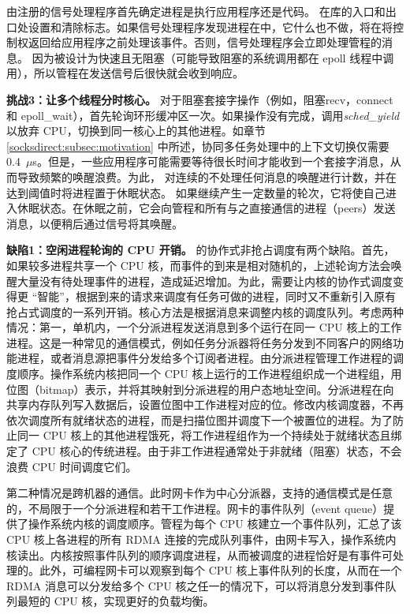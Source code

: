 由\libipc {}注册的信号处理程序首先确定进程是执行应用程序还是\libipc {}代码。 \libipc {}在库的入口和出口处设置和清除标志。如果信号处理程序发现进程在\libipc 中，它什么也不做，\libipc {}将在将控制权返回给应用程序之前处理该事件。否则，信号处理程序会立即处理管程的消息。
因为\libipc {}被设计为快速且无阻塞（可能导致阻塞的系统调用都在 epoll 线程中调用），所以管程在发送信号后很快就会收到响应。

\textbf {挑战3：让多个线程分时核心。}
对于阻塞套接字操作（例如，阻塞recv，connect 和 epoll\_wait），\libipc {}首先轮询环形缓冲区一次。如果操作没有完成，\libipc {}调用\textit {sched\_yield}以放弃 CPU，切换到同一核心上的其他进程。如章节 \ref {socksdirect:subsec:motivation} 中所述，协同多任务处理中的上下文切换仅需要0.4~$\mu$s。但是，一些应用程序可能需要等待很长时间才能收到一个套接字消息，从而导致频繁的唤醒浪费。为此，\libipc{} 对连续的不处理任何消息的唤醒进行计数，并在达到阈值时将进程置于休眠状态。
如果\libipc {}继续产生一定数量的轮次，它将使自己进入休眠状态。在休眠之前，它会向管程和所有与之直接通信的进程（peers）发送消息，以便稍后通过信号将其唤醒。

\textbf{缺陷1：空闲进程轮询的 CPU 开销。}
\libipc{} 的协作式非抢占调度有两个缺陷。首先，如果较多进程共享一个 CPU 核，而事件的到来是相对随机的，上述轮询方法会唤醒大量没有待处理事件的进程，造成延迟增加。为此，需要让内核的协作式调度变得更 ``智能''，根据到来的请求来调度有任务可做的进程，同时又不重新引入原有抢占式调度的一系列开销。核心方法是根据消息来调整内核的调度队列。考虑两种情况：第一，单机内，一个分派进程发送消息到多个运行在同一 CPU 核上的工作进程。这是一种常见的通信模式，例如任务分派器将任务分发到不同客户的网络功能进程，或者消息源把事件分发给多个订阅者进程。由分派进程管理工作进程的调度顺序。操作系统内核把同一个 CPU 核上运行的工作进程组织成一个进程组，用位图（bitmap）表示，并将其映射到分派进程的用户态地址空间。分派进程在向共享内存队列写入数据后，设置位图中工作进程对应的位。修改内核调度器，不再依次调度所有就绪状态的进程，而是扫描位图并调度下一个被置位的进程。为了防止同一 CPU 核上的其他进程饿死，将工作进程组作为一个持续处于就绪状态且绑定了 CPU 核心的传统进程。由于非工作进程通常处于非就绪（阻塞）状态，不会浪费 CPU 时间调度它们。

第二种情况是跨机器的通信。此时网卡作为中心分派器，支持的通信模式是任意的，不局限于一个分派进程和若干工作进程。网卡的事件队列（event queue）提供了操作系统内核的调度顺序。管程为每个 CPU 核建立一个事件队列，汇总了该 CPU 核上各进程的所有 RDMA 连接的完成队列事件，由网卡写入，操作系统内核读出。内核按照事件队列的顺序调度进程，从而被调度的进程恰好是有事件可处理的。此外，可编程网卡可以观察到每个 CPU 核上事件队列的长度，从而在一个 RDMA 消息可以分发给多个 CPU 核之任一的情况下，可以将消息分发到事件队列最短的 CPU 核，实现更好的负载均衡。

